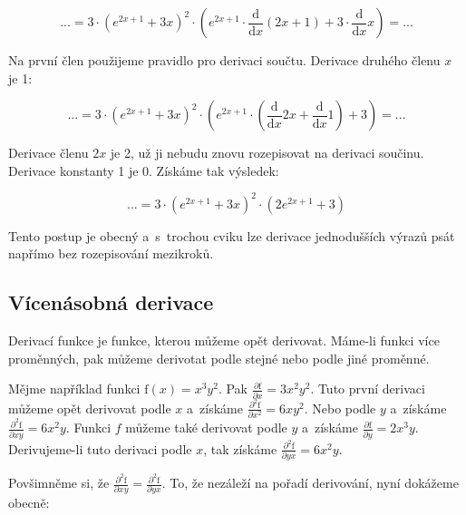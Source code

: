 \begin{equation}
... = 3 \cdot \left(e^{2x+1} + 3x \right)^2 \cdot \left(e^{2x+1} \cdot \frac{\mathrm{d}}{\mathrm{d}x} \left(2x+1\right) + 3 \cdot \frac{\mathrm{d}}{\mathrm{d}x} x \right) = ...
\end{equation}

Na první člen použijeme pravidlo pro derivaci součtu. Derivace druhého členu \(x\) je 1:

\begin{equation}
... = 3 \cdot \left(e^{2x+1} + 3x \right)^2 \cdot \left(e^{2x+1} \cdot \left(\frac{\mathrm{d}}{\mathrm{d}x} 2x + \frac{\mathrm{d}}{\mathrm{d}x} 1\right) + 3 \right) = ...
\end{equation}

Derivace členu \(2x\) je 2, už ji nebudu znovu rozepisovat na derivaci součinu. Derivace konstanty 1 je 0. Získáme tak výsledek:

\begin{equation}
... = 3 \cdot \left(e^{2x+1} + 3x \right)^2 \cdot \left(2 e^{2x+1} + 3 \right)
\end{equation}

Tento postup je obecný a~s~trochou cviku lze derivace jednodušších výrazů psát napřímo bez rozepisování mezikroků. 

\subsection{Vícenásobná derivace}

Derivací funkce je funkce, kterou můžeme opět derivovat. Máme-li funkci více proměnných, pak můžeme derivotat podle stejné nebo podle jiné proměnné.

Mějme například funkci \(\mathrm{f}(x) = x^3 y^2\). Pak \(\frac{\partial \mathrm{f}}{\partial x} = 3 x^2 y^2\). Tuto první derivaci můžeme opět derivovat podle \(x\) a~získáme \(\frac{\partial^2 \mathrm{f}}{\partial x^2} = 6 x y^2\). Nebo podle \(y\) a~získáme \(\frac{\partial^2 \mathrm{f}}{\partial xy} = 6 x^2 y\).
Funkci \(f\) můžeme také derivovat podle \(y\) a~získáme \(\frac{\partial \mathrm{f}}{\partial y} = 2 x^3 y\). Derivujeme-li tuto derivaci podle \(x\), tak získáme \(\frac{\partial^2 \mathrm{f}}{\partial yx} = 6 x^2 y\).

Povšimněme si, že \(\frac{\partial^2 \mathrm{f}}{\partial xy} = \frac{\partial^2 \mathrm{f}}{\partial yx}\). To, že nezáleží na pořadí derivování, nyní dokážeme obecně:

